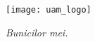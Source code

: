 \begin{center}
\texttt{[image: uam\_logo]}  
\end{center}


\newpage

\thispagestyle{empty}

\phantom{text}

\vspace{2cm}

\begin{flushright}
  {\em Bunicilor mei.}
\end{flushright}

\newpage

\thispagestyle{empty}

